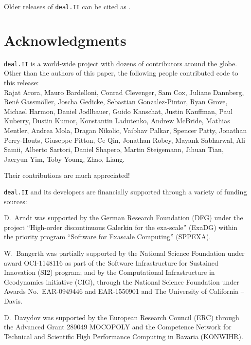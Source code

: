 \documentclass{ansarticle-preprint}
\newcommand{\specialword}[1]{\texttt{#1}}
\newcommand{\dealii}{{\specialword{deal.II}}}
\begin{document}
Older releases of \dealii{} can be cited as \cite{dealII80,dealII81,dealII82,dealII83,dealII84}.

\nocite{BangerthKanschat1999}

\section{Acknowledgments}

\dealii{} is a world-wide project with dozens of contributors around the
globe. Other than the authors of this paper, the following people contributed code to
this release:\\
%
%
Rajat  Arora,
Mauro  Bardelloni,
Conrad  Clevenger,
Sam  Cox,
Juliane  Dannberg,
Ren{\'e}  Gassm{\"o}ller,
Joscha  Gedicke,
Sebastian  Gonzalez-Pintor,
Ryan  Grove,
Michael  Harmon,
Daniel  Jodlbauer,
Guido  Kanschat,
Justin  Kauffman,
Paul  Kuberry,
Dustin  Kumor,
Konstantin  Ladutenko,
Andrew  McBride,
Mathias  Mentler,
Andrea  Mola,
Dragan  Nikolic,
Vaibhav  Palkar,
Spencer  Patty,
Jonathan  Perry-Houts,
Giuseppe  Pitton,
Ce  Qin,
Jonathan  Robey,
Mayank  Sabharwal,
Ali  Samii,
Alberto  Sartori,
Daniel  Shapero,
Martin  Steigemann,
Jihuan  Tian,
Jaeryun  Yim,
Toby  Young,
Zhao, Liang.

Their contributions are much appreciated!


\bigskip

\dealii{} and its developers are financially supported through a
variety of funding sources:

D.~Arndt was supported by the German Research Foundation (DFG) under the
project ``High-order discontinuous Galerkin for the exa-scale'' (ExaDG) within the
priority program ``Software for Exascale Computing'' (SPPEXA).

W.~Bangerth was partially
supported by the National Science Foundation under award OCI-1148116
as part of the Software Infrastructure for Sustained Innovation (SI2)
program; and by the Computational Infrastructure in Geodynamics initiative
(CIG), through the National Science Foundation under Awards
No.~EAR-0949446 and EAR-1550901 and The University of California -- Davis.

D.~Davydov was supported by the European Research Council (ERC) through the Advanced Grant 289049 MOCOPOLY and the Competence Network for Technical and Scientific High Performance Computing in Bavaria (KONWIHR).
\end{document}
